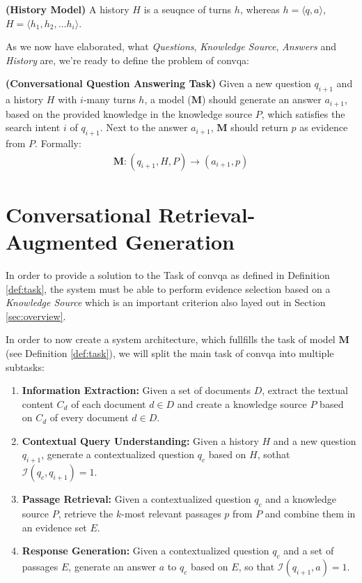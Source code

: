 \begin{definition}
    \textbf{(History Model)} A history $H$ is a seuqnce of turns $h$, whereas $h = \langle q,a\rangle$, $H = \langle h_1, h_2, \dots h_i\rangle$.
    \label{def:history_model}
\end{definition}

As we now have elaborated, what \textit{Questions}, \textit{Knowledge Source}, \textit{Answers} and \textit{History} are, we're ready to define the problem of \gls{convqa}:

\begin{definition}
    \textbf{(Conversational Question Answering Task)} Given a new question $q_{i+1}$ and a history $H$ with $i$-many turns $h$, a model ($\mathbf{M}$) should generate an answer $a_{i+1}$, based on the provided knowledge in the knowledge source $P$, which satisfies the search intent $i$ of $q_{i+1}$. Next to the answer $a_{i+1}$, $\mathbf{M}$ should return $p$ as evidence from $P$. Formally:
    \begin{align*}
        \mathbf{M}: (q_{i+1}, H, P) \rightarrow (a_{i+1}, p)
    \end{align*}
    \label{def:task}
\end{definition}

\section{Conversational Retrieval-Augmented Generation}
\label{sec:conrag}

In order to provide a solution to the Task of \gls{convqa} as defined in Definition \ref{def:task}, the system must be able to perform evidence selection based on a \textit{Knowledge Source} which is an important criterion also layed out in Section \ref{sec:overview}. 

In order to now create a system architecture, which fullfills the task of model $\mathbf{M}$ (see Definition \ref{def:task}), we will split the main task of \gls{convqa} into multiple subtasks:

\begin{enumerate}
    \item \textbf{Information Extraction:} Given a set of documents $D$, extract the textual content $C_d$ of each document $d \in D$ and create a knowledge source $P$ based on $C_d$ of every document $d \in D$.
    \item \textbf{Contextual Query Understanding:} Given a history $H$ and a new question $q_{i+1}$, generate a contextualized question $q_c$ based on $H$, sothat $\mathcal{I}(q_c,q_{i+1}) = 1$.
    \item \textbf{Passage Retrieval:} Given a contextualized question $q_c$ and a knowledge source $P$, retrieve the $k$-most relevant passages $p$ from $P$ and combine them in an evidence set $E$.
    \item \textbf{Response Generation:} Given a contextualized question $q_c$ and a set of passages $E$, generate an answer $a$ to $q_c$ based on $E$, so that $\mathcal{I}(q_{i+1},a) = 1$.
\end{enumerate}

